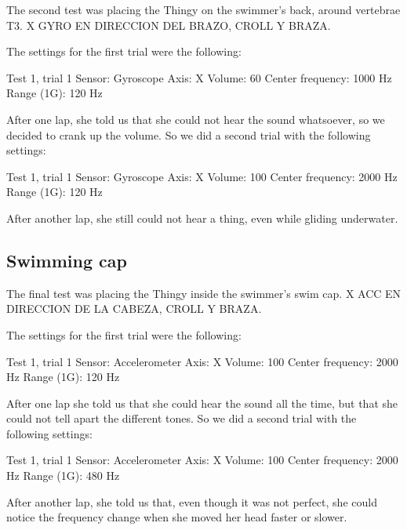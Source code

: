 The second test was placing the Thingy on the swimmer's back, around vertebrae T3. X GYRO EN DIRECCION DEL BRAZO, CROLL Y BRAZA.

The settings for the first trial were the following:
\begin{settings}{Test 1, trial 1}
Sensor: 					Gyroscope
Axis: 					X
Volume:					60%
Center frequency: 	1000 Hz
Range (1G):				120 Hz
\end{settings}

After one lap, she told us that she could not hear the sound whatsoever, so we decided to crank up the volume. So we did a second trial with the following settings:

\begin{settings}{Test 1, trial 1}
Sensor: 					Gyroscope
Axis: 					X
Volume:					100%
Center frequency: 	2000 Hz
Range (1G):				120 Hz
\end{settings}

After another lap, she still could not hear a thing, even while gliding underwater.
\subsection{Swimming cap}
The final test was placing the Thingy inside the swimmer's swim cap. X ACC EN DIRECCION DE LA CABEZA, CROLL Y BRAZA.

The settings for the first trial were the following:
\begin{settings}{Test 1, trial 1}
Sensor: 					Accelerometer
Axis: 					X
Volume:					100%
Center frequency: 	2000 Hz
Range (1G):				120 Hz
\end{settings}


After one lap she told us that she could hear the sound all the time, but that she could not tell apart the different tones. So we did a second trial with the following settings:
\begin{settings}{Test 1, trial 1}
Sensor: 					Accelerometer
Axis: 					X
Volume:					100%
Center frequency: 	2000 Hz
Range (1G):				480 Hz
\end{settings}


After another lap, she told us that, even though it was not perfect, she could notice the frequency change when she moved her head faster or slower.

